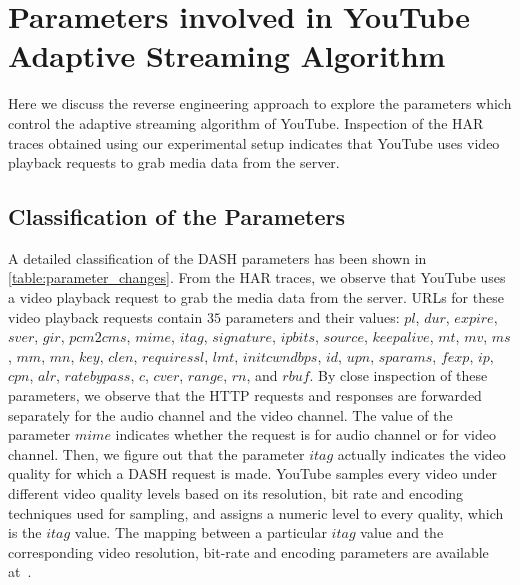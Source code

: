 \section{Parameters involved in YouTube Adaptive Streaming Algorithm}
\label{chap03s1:sec:parameters}
Here we discuss the reverse engineering approach to explore the parameters which control the adaptive streaming algorithm of YouTube. 
Inspection of the HAR traces obtained using our experimental setup indicates that YouTube uses video playback requests to grab media data from the server.
%
\subsection{Classification of the Parameters}
A detailed classification of the DASH parameters has been shown in \tbl\ref{table:parameter_changes}. From the HAR traces, we observe that YouTube uses a video playback request to grab the media data from the server. URLs for these video playback requests contain $35$ parameters and their values: $pl$, $dur$, $expire$, $sver$, $gir$, $pcm2cms$, $mime$, $itag$, $signature$, $ipbits$, $source$, $keepalive$, $mt$, $mv$, $ms$, $mm$, $mn$, $key$, $clen$, $requiressl$, $lmt$, $initcwndbps$, $id$, $upn$, $sparams$, $fexp$, $ip$, $cpn$, $alr$, $ratebypass$, $c$, $cver$, $range$, $rn$, and $rbuf$. By close inspection of these parameters, we observe that the HTTP requests and responses are forwarded separately for the audio channel and the video channel. The value of the parameter $mime$ indicates whether the request is for audio channel or for video channel. Then, we figure out that the parameter $itag$ actually indicates the video quality for which a DASH request is made. YouTube samples every video under different video quality levels based on its resolution, bit rate and encoding techniques used for sampling, and assigns a numeric level to every quality, which is the $itag$ value. The mapping between a particular $itag$ value and the corresponding video resolution, bit-rate and encoding parameters are available at~\cite{itag}. 

